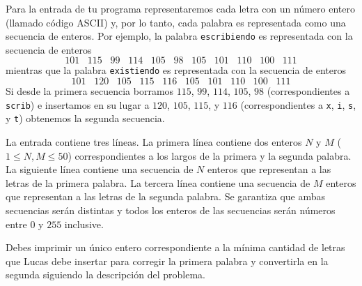 \documentclass{oci}
\begin{document}
\begin{problemDescription}
	Para la entrada de tu programa representaremos cada letra con un 
	número entero (llamado código ASCII) 
	y, por lo tanto,
  cada palabra es representada como una secuencia de enteros.
  Por ejemplo, la palabra \texttt{escribiendo} es representada con la secuencia de enteros
  \[
  101\;\;\; 115\;\;\; 99\;\;\; 114\;\;\; 105\;\;\; 98\;\;\; 105\;\;\; 101\;\;\; 110\;\;\; 100\;\;\; 111
  \]
	mientras que la palabra \texttt{existiendo} es representada con la secuencia de enteros
	\[ 
	101\;\;\; 120\;\;\; 105\;\;\; 115\;\;\; 116\;\;\; 105\;\;\; 101\;\;\; 110\;\;\; 100\;\;\; 111%
	\]
	Si desde la primera secuencia borramos $115$, $99$, $114$, $105$, $98$ (correspondientes a \texttt{scrib})
	e insertamos en su lugar a $120$, $105$, $115$, y $116$ 
	(correspondientes a \texttt{x}, \texttt{i}, \texttt{s}, y \texttt{t}) obtenemos la segunda secuencia.
\end{problemDescription}

\begin{inputDescription}
	La entrada contiene tres líneas.
  La primera línea contiene dos enteros $N$ y $M$ ($1\leq N,M \leq 50$)
  correspondientes a los largos de la primera y la segunda palabra.
  La siguiente línea contiene una secuencia de $N$ enteros que representan a las letras de la primera palabra.
  La tercera línea contiene una secuencia de $M$ enteros que representan a las letras de la segunda palabra.
  Se garantiza que ambas secuencias serán distintas y todos los enteros de las secuencias
  serán números entre $0$ y $255$ inclusive.
\end{inputDescription}

\begin{outputDescription}
%  
  Debes imprimir un único entero correspondiente a la
  mínima cantidad de letras que Lucas debe insertar para corregir la primera palabra y convertirla en la segunda 
  siguiendo la descripción del problema.
\end{outputDescription}
\end{document}
